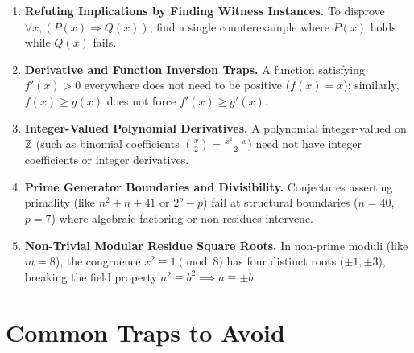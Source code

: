 \documentclass[11pt,a4paper]{article}
\begin{document}
\begin{enumerate}[leftmargin=2em, itemsep=4pt]
  \item \textbf{Refuting Implications by Finding Witness Instances.}
        To disprove $\forall x, (P(x) \Rightarrow Q(x))$, find a single counterexample where $P(x)$ holds while $Q(x)$ fails. 
  \item \textbf{Derivative and Function Inversion Traps.}
        A function satisfying $f'(x)>0$ everywhere does not need to be positive ($f(x)=x$); similarly, $f(x) \ge g(x)$ does not force $f'(x) \ge g'(x)$. 
  \item \textbf{Integer-Valued Polynomial Derivatives.}
        A polynomial integer-valued on $\mathbb{Z}$ (such as binomial coefficients $\binom{x}{2} = \frac{x^2-x}{2}$) need not have integer coefficients or integer derivatives. 
  \item \textbf{Prime Generator Boundaries and Divisibility.}
        Conjectures asserting primality (like $n^2+n+41$ or $2^p-p$) fail at structural boundaries ($n=40$, $p=7$) where algebraic factoring or non-residues intervene. 
  \item \textbf{Non-Trivial Modular Residue Square Roots.}
        In non-prime moduli (like $m=8$), the congruence $x^2 \equiv 1 \pmod 8$ has four distinct roots ($\pm 1, \pm 3$), breaking the field property $a^2 \equiv b^2 \implies a \equiv \pm b$. 
\end{enumerate}

\section*{Common Traps to Avoid}
\end{document}
